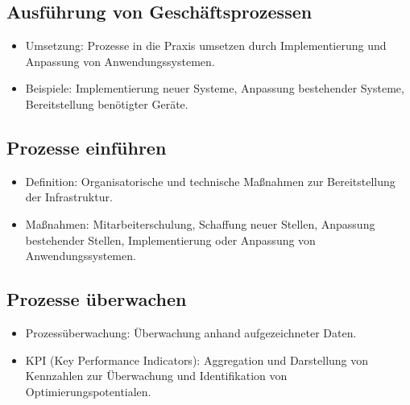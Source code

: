 \subsection{Ausführung von Geschäftsprozessen}
\begin{itemize}
    \item Umsetzung: Prozesse in die Praxis umsetzen durch Implementierung und Anpassung von Anwendungssystemen.
    \item Beispiele: Implementierung neuer Systeme, Anpassung bestehender Systeme, Bereitstellung benötigter Geräte.
\end{itemize}

\subsection{Prozesse einführen}
\begin{itemize}
    \item Definition: Organisatorische und technische Maßnahmen zur Bereitstellung der Infrastruktur.
    \item Maßnahmen: Mitarbeiterschulung, Schaffung neuer Stellen, Anpassung bestehender Stellen, Implementierung oder Anpassung von Anwendungssystemen.
\end{itemize}

\subsection{Prozesse überwachen}
\begin{itemize}
    \item Prozessüberwachung: Überwachung anhand aufgezeichneter Daten.
    \item KPI (Key Performance Indicators): Aggregation und Darstellung von Kennzahlen zur Überwachung und Identifikation von Optimierungspotentialen.
\end{itemize}